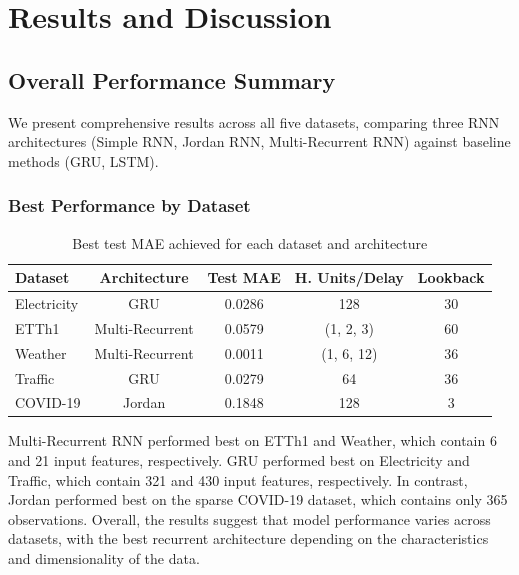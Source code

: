 \documentclass[conference]{IEEEtran}
\begin{document}

\section{Results and Discussion}
\label{sec:results}

\subsection{Overall Performance Summary}

We present comprehensive results across all five datasets, comparing three RNN architectures (Simple RNN, Jordan RNN, Multi-Recurrent RNN) against baseline methods (GRU, LSTM).

\subsubsection{Best Performance by Dataset}

\begin{table}[H]
\centering
\caption{Best test MAE achieved for each dataset and architecture}
\label{tab:best_results}
\begin{tabular}{lcccc}
\toprule
\textbf{Dataset} & \textbf{Architecture} & \textbf{Test MAE} &
\textbf{H. Units/Delay} & \textbf{Lookback} \\
\midrule
Electricity & GRU & 0.0286 & 128 & 30 \\
ETTh1 & Multi-Recurrent & 0.0579 & (1, 2, 3) & 60 \\
Weather & Multi-Recurrent & 0.0011 & (1, 6, 12) & 36 \\
Traffic & GRU & 0.0279 & 64 & 36 \\
COVID-19 & Jordan & 0.1848 & 128 & 3 \\
\bottomrule
\end{tabular}
\end{table}

Multi-Recurrent RNN performed best on ETTh1 and Weather, which
contain 6 and 21 input features, respectively. GRU performed best on
Electricity and Traffic, which contain 321 and 430 input features,
respectively. In contrast, Jordan performed best on the sparse
COVID-19 dataset, which contains only 365 observations. Overall, the
results suggest that model performance varies across
datasets, with the best recurrent architecture depending on
the characteristics and dimensionality of the data.
\end{document}
